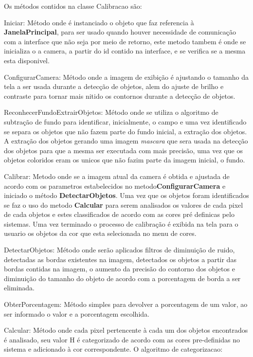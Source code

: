 Os métodos contidos na classe Calibracao são:
	\begin{description}

\item Iniciar: Método onde é instanciado o objeto que faz referencia à \textbf{JanelaPrincipal}, para ser usado quando houver necessidade de comunicação com a interface que não seja por meio de retorno, este metodo tambem é onde se inicializa o a camera, a partir do id contido na interface, e se verifica se a mesma esta disponivel.


\item ConfigurarCamera: Método onde a imagem de exibição é ajustando o tamanho da tela a ser usada durante a detecção de objetos, alem do ajuste de brilho e contraste para tornar mais nitido os contornos durante a detecção de objetos.	
	
  \item ReconhecerFundoExtrairObjetos: Método onde se utiliza o algoritmo de subtração de fundo para identificar, inicialmente, o campo e uma vez identificado se separa os objetos que não fazem parte do fundo inicial, a extração dos objetos. A extração dos objetos gerando uma imagem \textit{mascara} que sera usada na detecção dos objetos para que a mesma ser executada com mais precisão, uma vez que os objetos coloridos eram os unicos que não fazim parte da imagem inicial, o fundo.
  
 
	\item Calibrar: Metodo onde se a imagem atual da camera é obtida e ajustada de acordo com os parametros estabelecidos no metodo\textbf{ConfigurarCamera} e iniciado o método \textbf{DetectarObjetos}. Uma vez que os objetos foram identificados se faz o uso do metodo \textbf{Calcular}  para serem analisados os valores de cada pixel de cada objetos e estes classificados de acordo com as cores pré definicas pelo sistemas. Uma vez terminado o processo de calibração é exibida na tela para o usuario os objetos da cor que esta selecionada no menu de cores.			
		
	\item DetectarObjetos: Método onde serão aplicados filtros de diminuição de ruido, detectadas as bordas existentes na imagem, detectados os objetos a partir das bordas contidas na imagem, o aumento da precisão do contorno dos objetos e diminuição do tamanho do objeto de acordo com a porcentagem de borda a ser eliminada. 

	\item ObterPorcentagem: Método simples para devolver a porcentagem de um valor, ao ser informado o valor e a porcentagem escolhida.
		
		\item Calcular: Método onde cada pixel pertencente à cada um dos objetos encontrados é analisado, seu valor H é categorizado de acordo com as cores pre-definidas no sistema e adicionado à cor correspondente.
		O algoritmo de categorizacao:
 
	
		\end{description}	

